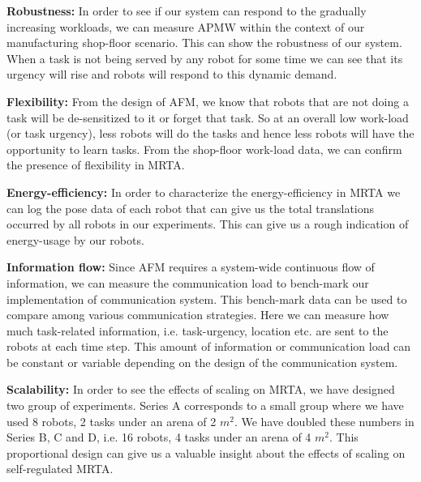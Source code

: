 \documentclass{intech}
\begin{document}
\textbf{Robustness:} In order to see if our system can respond to the gradually increasing workloads,  we can measure APMW within the context of our manufacturing shop-floor scenario. This can show the robustness of our system. When a task is not being served by any robot for some time we can see that its urgency will rise and robots will respond to this dynamic demand. 

\textbf{Flexibility:} From the design of AFM, we know that robots that are not doing a task will be de-sensitized to it or forget that task. So at an overall low work-load (or task urgency), less robots will do the tasks and hence less robots will have the opportunity to learn tasks. From the shop-floor work-load data, we can confirm the presence of flexibility in MRTA.

\textbf{Energy-efficiency:} In order to characterize the energy-efficiency in MRTA we can log the pose data of each robot that can give us the total translations occurred by all robots in our experiments. This can give us a rough indication of energy-usage by our robots. 

\textbf{Information flow:} Since AFM requires a system-wide continuous flow of information, we can measure the communication load to bench-mark our implementation of communication system. This bench-mark data can be used to compare among various communication strategies. Here we can measure  how much task-related information, i.e. task-urgency, location etc. are sent to the robots at each time step. This  amount of information or communication load can be constant or variable depending on the design of the communication system.

\textbf{Scalability:} In order to see the effects of scaling on MRTA, we have designed two group of experiments. Series A corresponds to a small group where we have used 8 robots, 2 tasks under an arena of 2 $m^2$. We have doubled these numbers in Series B, C and D, i.e. 16 robots, 4 tasks under an arena of 4 $m^2$. This proportional design can give us a valuable insight about the effects of scaling on self-regulated MRTA. 
\end{document}
